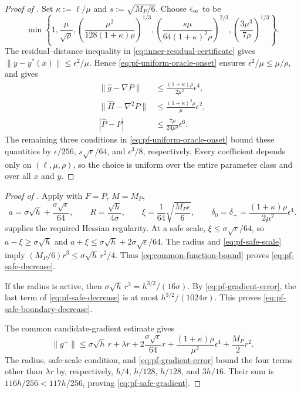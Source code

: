 \documentclass{article}
\begin{document}
\begin{proof}[Proof of ]
Set $\kappa:=\ell/\mu$ and $s:=\sqrt{M_P/6}$.  Choose
$\epsilon_{\rm or}$ to be
\begin{equation}\label{eq:pf-uniform-oracle-onset}
 \min\left\{
  1,\frac{\mu}{\sqrt\rho},
  \left(\frac{\mu^2}{128(1+\kappa)\rho}\right)^{1/3},
  \left(\frac{s\mu}{64(1+\kappa)^2\rho}\right)^{2/3},
  \left(\frac{3\mu^3}{7\rho}\right)^{1/3}
 \right\}.
\end{equation}
The residual--distance inequality in
\eqref{eq:inner-residual-certificate} gives
$\|y-y^*(x)\|\le\epsilon^2/\mu$.  Hence
\eqref{eq:pf-uniform-oracle-onset} ensures
$\epsilon^2/\mu\le\mu/\rho$, and
 gives
\begin{align*}
 \|\widehat g-\nabla P\|
 &\le\frac{(1+\kappa)\rho}{2\mu^2}\epsilon^4,\\
 \|\widehat H-\nabla^2P\|
 &\le\frac{(1+\kappa)^2\rho}{\mu}\epsilon^2,\\
 |\widehat P-P|
 &\le\frac{7\rho}{24\mu^3}\epsilon^6.
\end{align*}
The remaining three conditions in
\eqref{eq:pf-uniform-oracle-onset} bound these quantities by
$\epsilon/256$, $s\sqrt\epsilon/64$, and $\epsilon^3/8$,
respectively.  Every coefficient depends only on
$(\ell,\mu,\rho)$, so the choice is uniform over the entire parameter
class and over all $x$ and $y$.
\end{proof}

\begin{proof}[Proof of ]
Apply  with $F=P$, $M=M_P$,
\[
 a=\sigma\sqrt h+\frac{\sigma\sqrt\epsilon}{64},\qquad
 R=\frac{\sqrt h}{4\sigma},\qquad
 \xi=\frac1{64}\sqrt{\frac{M_P\epsilon}{6}},\qquad
 \delta_0=\delta_+=\frac{(1+\kappa)\rho}{2\mu^2}\epsilon^4.
\]
 supplies the required Hessian regularity.
At a safe scale, $\xi\le\sigma\sqrt\epsilon/64$, so
$a-\xi\ge\sigma\sqrt h$ and
$a+\xi\le\sigma\sqrt h+2\sigma\sqrt\epsilon/64$.
The radius and \eqref{eq:pf-safe-scale} imply
$(M_P/6)r^3\le\sigma\sqrt h\,r^2/4$.
Thus \eqref{eq:common-function-bound} proves
\eqref{eq:pf-safe-decrease}.

If the radius is active, then
$\sigma\sqrt h\,r^2=h^{3/2}/(16\sigma)$.  By
\eqref{eq:pf-gradient-error}, the last term of
\eqref{eq:pf-safe-decrease} is at most
$h^{3/2}/(1024\sigma)$.  This proves
\eqref{eq:pf-safe-boundary-decrease}.

The common candidate-gradient estimate gives
\[
 \|g^+\|
 \le\sigma\sqrt h\,r+\lambda r
 +2\frac{\sigma\sqrt\epsilon}{64}r
 +\frac{(1+\kappa)\rho}{\mu^2}\epsilon^4
 +\frac{M_P}{2}r^2.
\]
The radius, safe-scale condition, and
\eqref{eq:pf-gradient-error} bound the four terms other than
$\lambda r$ by, respectively,
$h/4$, $h/128$, $h/128$, and $3h/16$.  Their sum is
$116h/256<117h/256$, proving
\eqref{eq:pf-safe-gradient}.
\end{proof}
\end{document}
